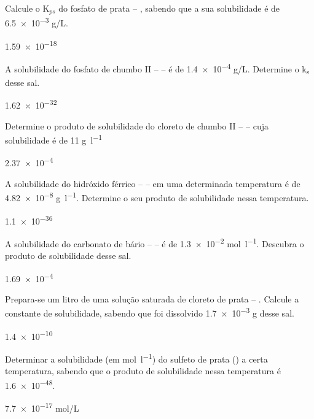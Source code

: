 \documentclass[11pt]{scrartcl}
\begin{document}
\begin{exercise}
Calcule o K\(_{ps}\) do fosfato de prata – , sabendo que a sua solubilidade é de \num{6.5e-3} g/L.
\end{exercise}
\begin{solution}
\num{1.59e-18}
\end{solution}

\begin{exercise}
A solubilidade do fosfato de chumbo II –  – é de \num{1.4e-4} g/L. Determine o k\textsubscript{s} desse sal.
\end{exercise}
\begin{solution}
\num{1.62e-32}
\end{solution}

\begin{exercise}
Determine o produto de solubilidade do cloreto de chumbo II –   – cuja solubilidade é de 11 \unit{\gram\per\litre}
\end{exercise}
\begin{solution}
\num{2.37e-4}
\end{solution}

\begin{exercise}
A solubilidade do hidróxido férrico –  – em uma determinada temperatura é de \num{4.82e-8} \unit{\gram\per\litre}. Determine o seu produto de solubilidade nessa temperatura. 
\end{exercise}
\begin{solution}
\num{1.1e-36}
\end{solution}

\begin{exercise}
A solubilidade do carbonato de bário –  – é de \num{1.3e-2} \unit{\mol\per\litre}. Descubra o produto de solubilidade desse sal.
\end{exercise}
\begin{solution}
\num{1.69e-4}
\end{solution}

\begin{exercise}
Prepara-se um litro de uma solução saturada de cloreto de prata –  . Calcule a constante de solubilidade, sabendo que foi dissolvido \num{1.7e-3} g desse sal.
\end{exercise}
\begin{solution}
\num{1.4e-10}
\end{solution}

\begin{exercise}
Determinar a solubilidade (em \unit{\mol\per\litre}) do sulfeto de prata () a certa temperatura, sabendo que o produto de solubilidade nessa temperatura é \num{1.6e-48}.
\end{exercise}
\begin{solution}
\num{7.7e-17} mol/L
\end{solution}
\end{document}
